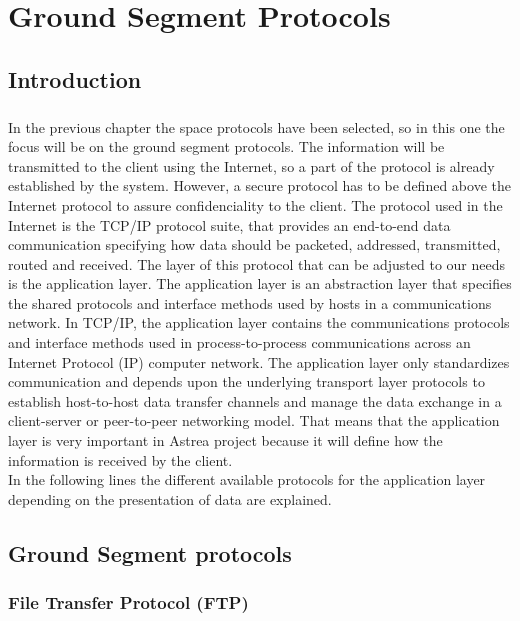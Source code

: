 \chapter{Ground Segment Protocols}

\section{Introduction}

\paragraph{}In the previous chapter the space protocols have been selected, so in this one the focus will be on the ground segment protocols. The information will be transmitted to the client using the Internet, so a part of the protocol is already established by the system. However, a secure protocol has to be defined above the Internet protocol to assure confidenciality to the client. The protocol used in the Internet is the TCP/IP protocol suite, that provides an end-to-end data communication specifying how data should be packeted, addressed, transmitted, routed and received. The layer of this protocol that can be adjusted to our needs is the application layer. The application layer is an abstraction layer that specifies the shared protocols and interface methods used by hosts in a communications network. In TCP/IP, the application layer contains the communications protocols and interface methods used in process-to-process communications across an Internet Protocol (IP) computer network. The application layer only standardizes communication and depends upon the underlying transport layer protocols to establish host-to-host data transfer channels and manage the data exchange in a client-server or peer-to-peer networking model. That means that the application layer is very important in Astrea project because it will define how the information is received by the client.\\
In the following lines the different available protocols for the application layer depending on the presentation of data are explained.

\section{Ground Segment protocols}

\subsection{File Transfer Protocol (FTP)} 
